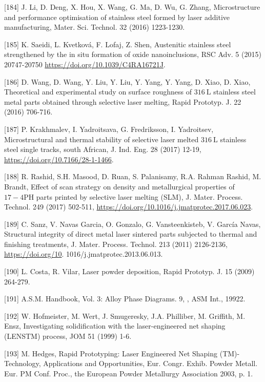 \documentclass[10pt]{article}
\begin{document}
[184] J. Li, D. Deng, X. Hou, X. Wang, G. Ma, D. Wu, G. Zhang, Microstructure and performance optimisation of stainless steel formed by laser additive manufacturing, Mater. Sci. Technol. 32 (2016) 1223-1230.

[185] K. Saeidi, L. Kvetková, F. Lofaj, Z. Shen, Austenitic stainless steel strengthened by the in situ formation of oxide nanoinclusions, RSC Adv. 5 (2015) 20747-20750 \href{https://doi.org/10.1039/C4RA16721J}{https://doi.org/10.1039/C4RA16721J}.

[186] D. Wang, D. Wang, Y. Liu, Y. Liu, Y. Yang, Y. Yang, D. Xiao, D. Xiao, Theoretical and experimental study on surface roughness of $316 \mathrm{~L}$ stainless steel metal parts obtained through selective laser melting, Rapid Prototyp. J. 22 (2016) 706-716.

[187] P. Krakhmalev, I. Yadroitsava, G. Fredriksson, I. Yadroitsev, Microstructural and thermal stability of selective laser melted $316 \mathrm{~L}$ stainless steel single tracks, south African, J. Ind. Eng. 28 (2017) 12-19, \href{https://doi.org/10.7166/28-1-1466}{https://doi.org/10.7166/28-1-1466}.

[188] R. Rashid, S.H. Masood, D. Ruan, S. Palanisamy, R.A. Rahman Rashid, M. Brandt, Effect of scan strategy on density and metallurgical properties of $17-4 \mathrm{PH}$ parts printed by selective laser melting (SLM), J. Mater. Process. Technol. 249 (2017) 502-511, \href{https://doi.org/10.1016/j.jmatprotec.2017.06.023}{https://doi.org/10.1016/j.jmatprotec.2017.06.023}.

[189] C. Sanz, V. Navas Garcia, O. Gonzalo, G. Vansteenkisteb, V. García Navas, Structural integrity of direct metal laser sintered parts subjected to thermal and finishing treatments, J. Mater. Process. Technol. 213 (2011) 2126-2136, \href{https://doi.org/10}{https://doi.org/10}. 1016/j.jmatprotec.2013.06.013.

[190] L. Costa, R. Vilar, Laser powder deposition, Rapid Prototyp. J. 15 (2009) 264-279.

[191] A.S.M. Handbook, Vol. 3: Alloy Phase Diagrams. 9, , ASM Int., 19922.

[192] W. Hofmeister, M. Wert, J. Smugeresky, J.A. Philliber, M. Griffith, M. Ensz, Investigating solidification with the laser-engineered net shaping (LENSTM) process, JOM 51 (1999) 1-6.

[193] M. Hedges, Rapid Prototyping: Laser Engineered Net Shaping (TM)-Technology, Applications and Opportunities, Eur. Congr. Exhib. Powder Metall. Eur. PM Conf. Proc., the European Powder Metallurgy Association 2003, p. 1.
\end{document}
